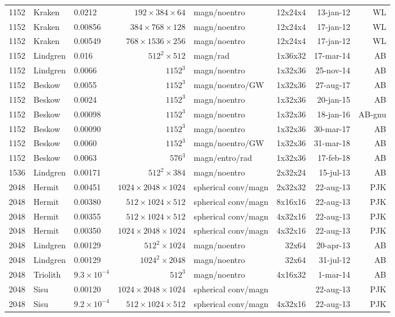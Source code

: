 \documentclass[\mydriver,12pt,twoside,notitlepage,a4paper]{article}
\begin{document}
\begin{center}
\begin{footnotesize}
\begin{longtable}{rllrlrrr}
1152&Kraken&0.0212&$192{\!\times\!}384{\!\times\!}64$&magn/noentro&12x24x4               &13-jan-12&WL\\
1152&Kraken& 0.00856  &$384{\!\times\!}768{\!\times\!}128$ & magn/noentro & 12x24x4 &17-jan-12 & WL\\
1152&Kraken& 0.00549  &$768{\!\times\!}1536{\!\times\!}256$ & magn/noentro & 12x24x4 &17-jan-12 & WL\\
1152&Lindgren&0.016&$512^2{\!\times\!}512$&magn/rad&1x36x32&17-mar-14& AB \\
1152&Lindgren&0.0066&$1152^3$&magn/noentro&1x32x36&25-nov-14& AB \\
1152&Beskow&0.0055&$1152^3$&magn/noentro/GW&1x32x36&27-aug-17& AB \\
1152&Beskow&0.0024&$1152^3$&magn/noentro&1x32x36&20-jan-15& AB \\
1152&Beskow&0.00098&$1152^3$&magn/noentro&1x32x36&18-jan-16& AB-gnu \\
1152&Beskow&0.00090&$1152^3$&magn/noentro&1x32x36&30-mar-17& AB \\
1152&Beskow&0.0060 &$1152^3$&magn/noentro/GW&1x32x36 &31-mar-18 & AB \\
1152&Beskow&0.0063 &$ 576^3$&magn/entro/rad&1x32x36 &17-feb-18 & AB \\
1536&Lindgren&0.00171&$512^2{\!\times\!}384$&magn/noentro&2x32x24&15-jul-13& AB \\
2048&Hermit&0.00451&$1024{\!\times\!}2048{\!\times\!}1024$&spherical conv/magn&2x32x32&22-aug-13&PJK\\
2048&Hermit&0.00380&$512{\!\times\!}1024{\!\times\!}512$&spherical conv/magn&8x16x16&22-aug-13&PJK\\
2048&Hermit&0.00355&$512{\!\times\!}1024{\!\times\!}512$&spherical conv/magn&4x32x16&22-aug-13&PJK\\
2048&Hermit&0.00350&$1024{\!\times\!}2048{\!\times\!}1024$&spherical conv/magn&4x32x16&22-aug-13&PJK\\
2048&Lindgren&0.00129&$512^2{\!\times\!}1024$&magn/noentro&32x64&20-apr-13& AB \\
2048&Lindgren&0.00129&$1024^2{\!\times\!}2048$&magn/noentro&32x64&31-jul-12& AB \\
2048 &Triolith&  $9.3{\!\times\!}10^{-4}$ &$ 512^3$&magn/noentro&4x16x32& 1-mar-14 & AB  \\
2048&Sisu&0.00120&$1024{\!\times\!}2048{\!\times\!}1024$&spherical conv/magn& &22-aug-13&PJK\\
2048&Sisu&$9.2{\!\times\!}10^{-4}$&$512{\!\times\!}1024{\!\times\!}512$&spherical conv/magn&4x32x16&22-aug-13&PJK\\

\end{longtable}
\end{footnotesize}
\end{center}
\end{document}
